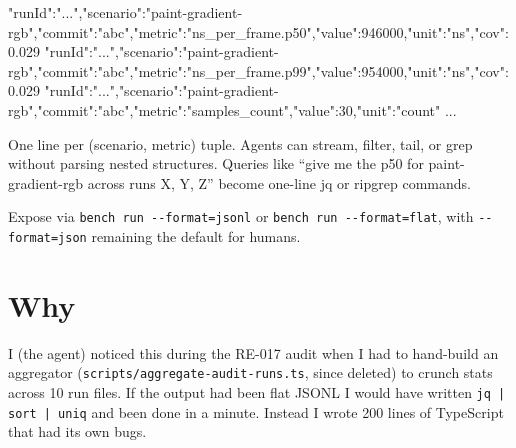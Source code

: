 \begin{CodeBlock}
{"runId":"...","scenario":"paint-gradient-rgb","commit":"abc","metric":"ns_per_frame.p50","value":946000,"unit":"ns","cov":0.029}
{"runId":"...","scenario":"paint-gradient-rgb","commit":"abc","metric":"ns_per_frame.p99","value":954000,"unit":"ns","cov":0.029}
{"runId":"...","scenario":"paint-gradient-rgb","commit":"abc","metric":"samples_count","value":30,"unit":"count"}
...
\end{CodeBlock}

One line per (scenario, metric) tuple. Agents can stream, filter, tail, or grep without parsing nested structures. Queries like ``give me the p50 for paint-gradient-rgb across runs X, Y, Z'' become one-line jq or ripgrep commands.

Expose via \texttt{b\allowbreak{}e\allowbreak{}n\allowbreak{}c\allowbreak{}h\allowbreak{} \allowbreak{}r\allowbreak{}u\allowbreak{}n\allowbreak{} \allowbreak{}-\allowbreak{}-\allowbreak{}f\allowbreak{}o\allowbreak{}r\allowbreak{}m\allowbreak{}a\allowbreak{}t\allowbreak{}=\allowbreak{}j\allowbreak{}s\allowbreak{}o\allowbreak{}n\allowbreak{}l} or \texttt{b\allowbreak{}e\allowbreak{}n\allowbreak{}c\allowbreak{}h\allowbreak{} \allowbreak{}r\allowbreak{}u\allowbreak{}n\allowbreak{} \allowbreak{}-\allowbreak{}-\allowbreak{}f\allowbreak{}o\allowbreak{}r\allowbreak{}m\allowbreak{}a\allowbreak{}t\allowbreak{}=\allowbreak{}f\allowbreak{}l\allowbreak{}a\allowbreak{}t}, with \texttt{-\allowbreak{}-\allowbreak{}f\allowbreak{}o\allowbreak{}r\allowbreak{}m\allowbreak{}a\allowbreak{}t\allowbreak{}=\allowbreak{}j\allowbreak{}s\allowbreak{}o\allowbreak{}n} remaining the default for humans.

\section{Why}\label{record-324-why}

I (the agent) noticed this during the RE-017 audit when I had to hand-build an aggregator (\texttt{s\allowbreak{}c\allowbreak{}r\allowbreak{}i\allowbreak{}p\allowbreak{}t\allowbreak{}s\allowbreak{}/\allowbreak{}a\allowbreak{}g\allowbreak{}g\allowbreak{}r\allowbreak{}e\allowbreak{}g\allowbreak{}a\allowbreak{}t\allowbreak{}e\allowbreak{}-\allowbreak{}a\allowbreak{}u\allowbreak{}d\allowbreak{}i\allowbreak{}t\allowbreak{}-\allowbreak{}r\allowbreak{}u\allowbreak{}n\allowbreak{}s\allowbreak{}.\allowbreak{}t\allowbreak{}s}, since deleted) to crunch stats across 10 run files. If the output had been flat JSONL I would have written \texttt{j\allowbreak{}q\allowbreak{} \allowbreak{}|\allowbreak{} \allowbreak{}s\allowbreak{}o\allowbreak{}r\allowbreak{}t\allowbreak{} \allowbreak{}|\allowbreak{} \allowbreak{}u\allowbreak{}n\allowbreak{}i\allowbreak{}q} and been done in a minute. Instead I wrote 200 lines of TypeScript that had its own bugs.

